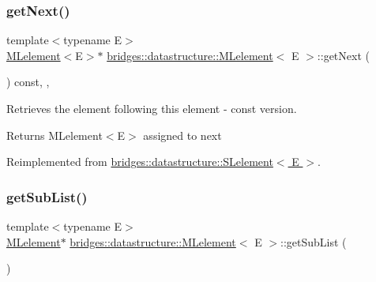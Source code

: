 \subsubsection{\texorpdfstring{get\+Next()}{getNext()}\hspace{0.1cm}{\footnotesize\ttfamily [2/2]}}
{\footnotesize\ttfamily template$<$typename E$>$ \\
\hyperlink{classbridges_1_1datastructure_1_1_m_lelement}{M\+Lelement}$<$E$>$$\ast$ \hyperlink{classbridges_1_1datastructure_1_1_m_lelement}{bridges\+::datastructure\+::\+M\+Lelement}$<$ E $>$\+::get\+Next (\begin{DoxyParamCaption}{ }\end{DoxyParamCaption}) const\hspace{0.3cm}{\ttfamily [inline]}, {\ttfamily [override]}, {\ttfamily [virtual]}}



Retrieves the element following this element -\/ const version. 

\begin{DoxyReturn}{Returns}
M\+Lelement$<$\+E$>$ assigned to next 
\end{DoxyReturn}


Reimplemented from \hyperlink{classbridges_1_1datastructure_1_1_s_lelement_a8c62cb82fa64bbfe9ebb7334a5fea417}{bridges\+::datastructure\+::\+S\+Lelement$<$ E $>$}.

\mbox{\label{classbridges_1_1datastructure_1_1_m_lelement_a9faeb30ffd023746ce36e05705a62b2d}} 
\subsubsection{\texorpdfstring{get\+Sub\+List()}{getSubList()}}
{\footnotesize\ttfamily template$<$typename E$>$ \\
\hyperlink{classbridges_1_1datastructure_1_1_m_lelement}{M\+Lelement}$\ast$ \hyperlink{classbridges_1_1datastructure_1_1_m_lelement}{bridges\+::datastructure\+::\+M\+Lelement}$<$ E $>$\+::get\+Sub\+List (\begin{DoxyParamCaption}{ }\end{DoxyParamCaption})\hspace{0.3cm}{\ttfamily [inline]}}



